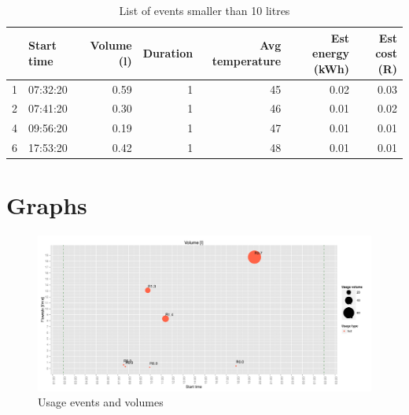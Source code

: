 \documentclass{article}\usepackage[]{graphicx}\usepackage[]{color}
\makeatletter
\def\maxwidth{ %
  \ifdim\Gin@nat@width>\linewidth
    \linewidth
  \else
    \Gin@nat@width
  \fi
}
\newenvironment{knitrout}{}{} %
\makeatother
\begin{document}
\begin{center}
\begin{table}[h!]
\begin{knitrout}
\color{fgcolor}
\begin{tabular}{l|l|r|r|r|r|r}
\hline
  & Start time & Volume (l) & Duration & Avg temperature & Est energy (kWh) & Est cost (R)\\
\hline
1 & 07:32:20 & 0.59 & 1 & 45 & 0.02 & 0.03\\
\hline
2 & 07:41:20 & 0.30 & 1 & 46 & 0.01 & 0.02\\
\hline
4 & 09:56:20 & 0.19 & 1 & 47 & 0.01 & 0.01\\
\hline
6 & 17:53:20 & 0.42 & 1 & 48 & 0.01 & 0.01\\
\hline
\end{tabular}


\end{knitrout}
\caption{List of events smaller than 10 litres}
\end{table}
\end{center}




\newpage

\section{Graphs}
\begin{knitrout}
\color{fgcolor}\begin{figure}[h!]

{\centering \includegraphics[width=\maxwidth]{figure/balloon-1} 

}

\caption[Usage events and volumes]{Usage events and volumes}\label{fig:balloon}
\end{figure}


\end{knitrout}
\end{document}
